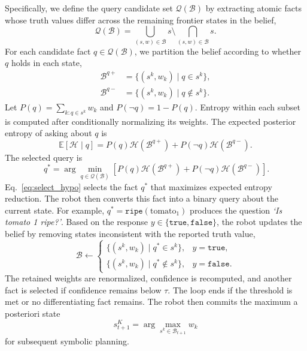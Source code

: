Specifically, we define the query candidate set $\mathcal{Q}(\mathcal{B})$ by extracting atomic facts whose truth values differ across the remaining frontier states in the belief,
\[\mathcal{Q}(\mathcal{B}) = \bigcup_{(s,w)\in\mathcal{B}}s \setminus \bigcap_{(s,w)\in\mathcal{B}}s.\]
For each candidate fact $q\in\mathcal{Q}(\mathcal{B})$, we partition the belief according to whether $q$ holds in each state,
\[
\begin{aligned}
\mathcal{B}^{q+}&=\{(s^k,w_k)\mid q\in s^k\},\\
\mathcal{B}^{q-}&=\{(s^k,w_k)\mid q\notin s^k\}.
\end{aligned}
\]
Let $P(q)=\sum_{k:q\in s^k}w_k$ and $P(\neg q)=1-P(q)$. Entropy within each subset is computed after conditionally normalizing its weights. The expected posterior entropy of asking about $q$ is
\[\mathbb{E}[\mathcal{H}\mid q] = P(q)\mathcal{H}(\mathcal{B}^{q+}) + P(\neg q)\mathcal{H}(\mathcal{B}^{q-}).\]
The selected query is
\begin{equation}~\label{eq:select_hypo}
q^* = \arg\min_{q\in\mathcal{Q}(\mathcal{B})} \left[P(q)\mathcal{H}(\mathcal{B}^{q+})+P(\neg q)\mathcal{H}(\mathcal{B}^{q-})\right].
\end{equation}
Eq.~\ref{eq:select_hypo} selects the fact $q^*$ that maximizes expected entropy reduction. The robot then converts this fact into a binary query about the current state. For example, $q^*=\texttt{ripe}(\text{tomato}_1)$ produces the question \textit{`Is tomato 1 ripe?'}. Based on the response $y\in\{\texttt{true},\texttt{false}\}$, the robot updates the belief by removing states inconsistent with the reported truth value,
\begin{equation}
\mathcal{B}
\leftarrow
\begin{cases}
\{(s^k,w_k)\mid q^*\in s^k\}, & y=\texttt{true},\\
\{(s^k,w_k)\mid q^*\notin s^k\}, & y=\texttt{false}.
\end{cases}
\label{eq:filter}
\end{equation}
The retained weights are renormalized, confidence is recomputed, and another fact is selected if confidence remains below $\tau$. The loop ends if the threshold is met or no differentiating fact remains. The robot then commits the maximum a posteriori state
\[s_{t+1}^{K} = \arg\max_{s^k\in\mathcal{B}_{t+1}}w_k \]
for subsequent symbolic planning.

